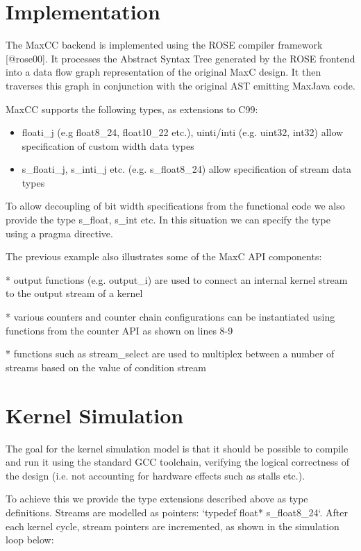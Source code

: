 \section{Implementation}

The MaxCC backend is implemented using the ROSE compiler framework
[@rose00]. It processes the Abstract Syntax Tree generated by the ROSE
frontend into a data flow graph representation of the original MaxC
design. It then traverses this graph in conjunction with the original
AST emitting MaxJava code.

MaxCC supports the following types, as extensions to C99:

\begin{itemize}
\item floati\_j (e.g float8\_24, float10\_22 etc.), uinti/inti
  (e.g. uint32, int32) allow specification of custom width data
  types

\item s\_floati\_j, s\_inti\_j etc. (e.g. s\_float8\_24) allow specification of
  stream data types
\end{itemize}

To allow decoupling of bit width specifications from the functional
code we also provide the type s\_float, s\_int etc. In this
situation we can specify the type using a pragma directive.

The previous example also illustrates some of the MaxC API components:

 * output functions (e.g. output\_i) are used to connect an internal
   kernel stream to the output stream of a kernel

 * various counters and counter chain configurations can be
   instantiated using functions from the counter API as shown on lines
   8-9

 * functions such as stream\_select are used to multiplex between a
   number of streams based on the value of condition stream

\section{Kernel Simulation}

The goal for the kernel simulation model is that it should be possible
to compile and run it using the standard GCC toolchain, verifying the
logical correctness of the design (i.e. not accounting for hardware
effects such as stalls etc.).

To achieve this we provide the type extensions described above as type
definitions. Streams are modelled as pointers: `typedef float*
s\_float8\_24`. After each kernel cycle, stream pointers are
incremented, as shown in the simulation loop below:

